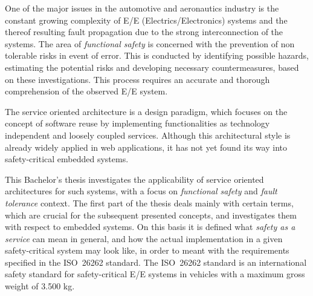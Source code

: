 One of the major issues in the automotive and aeronautics industry is the constant growing complexity of E/E (Electrics/Electronics) systems and the thereof resulting fault propagation due to the strong interconnection of the systems. The area of \emph{functional safety} is concerned with the prevention of non tolerable risks in event of error. This is conducted by identifying possible hazards, estimating the potential risks and developing necessary countermeasures, based on these investigations. This process requires an accurate and thorough comprehension of the observed E/E system.

The service oriented architecture is a design paradigm, which focuses on the concept of software reuse by implementing functionalities as technology independent and loosely coupled services. Although this architectural style is already widely applied in web applications, it has not yet found its way into safety-critical embedded systems.

This Bachelor's thesis investigates the applicability of service oriented architectures for such systems, with a focus on \emph{functional safety} and \emph{fault tolerance} context. The first part of the thesis deals mainly with certain terms, which are crucial for the subsequent presented concepts, and investigates them with respect to embedded systems. On this basis it is defined what \emph{safety as a service} can mean in general, and how the actual implementation in a given safety-critical system may look like, in order to meant with the requirements specified in the \mbox{ISO 26262} standard. The \mbox{ISO 26262} standard is an international safety standard for safety-critical E/E systems in vehicles with a maximum gross weight of 3.500 kg.